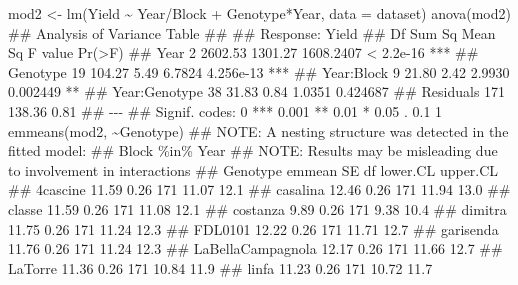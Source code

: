 \documentclass[a4paper,12pt,oneside]{book}
\newenvironment{Shaded}{\begin{snugshade}}{\end{snugshade}}
\newcommand{\SpecialCharTok}[1]{#1}
\newcommand{\DocumentationTok}[1]{#1}
\newcommand{\OtherTok}[1]{#1}
\newcommand{\FunctionTok}[1]{#1}
\newcommand{\AttributeTok}[1]{#1}
\newcommand{\AlertTok}[1]{#1}
\newcommand{\NormalTok}[1]{#1}
\begin{document}
\begin{Shaded}
\begin{Highlighting}[]
\NormalTok{mod2 }\OtherTok{\textless{}{-}} \FunctionTok{lm}\NormalTok{(Yield }\SpecialCharTok{\textasciitilde{}}\NormalTok{ Year}\SpecialCharTok{/}\NormalTok{Block }\SpecialCharTok{+}\NormalTok{ Genotype}\SpecialCharTok{*}\NormalTok{Year, }
           \AttributeTok{data =}\NormalTok{ dataset)}
\FunctionTok{anova}\NormalTok{(mod2)}
\DocumentationTok{\#\# Analysis of Variance Table}
\DocumentationTok{\#\# }
\DocumentationTok{\#\# Response: Yield}
\DocumentationTok{\#\#                Df  Sum Sq Mean Sq   F value    Pr(\textgreater{}F)    }
\DocumentationTok{\#\# Year            2 2602.53 1301.27 1608.2407 \textless{} 2.2e{-}16 ***}
\DocumentationTok{\#\# Genotype       19  104.27    5.49    6.7824 4.256e{-}13 ***}
\DocumentationTok{\#\# Year:Block      9   21.80    2.42    2.9930  0.002449 ** }
\DocumentationTok{\#\# Year:Genotype  38   31.83    0.84    1.0351  0.424687    }
\DocumentationTok{\#\# Residuals     171  138.36    0.81                        }
\DocumentationTok{\#\# {-}{-}{-}}
\DocumentationTok{\#\# Signif. codes:  0 \textquotesingle{}***\textquotesingle{} 0.001 \textquotesingle{}**\textquotesingle{} 0.01 \textquotesingle{}*\textquotesingle{} 0.05 \textquotesingle{}.\textquotesingle{} 0.1 \textquotesingle{} \textquotesingle{} 1}
\FunctionTok{emmeans}\NormalTok{(mod2, }\SpecialCharTok{\textasciitilde{}}\NormalTok{Genotype)}
\DocumentationTok{\#\# }\AlertTok{NOTE}\DocumentationTok{: A nesting structure was detected in the fitted model:}
\DocumentationTok{\#\#     Block \%in\% Year}
\DocumentationTok{\#\# }\AlertTok{NOTE}\DocumentationTok{: Results may be misleading due to involvement in interactions}
\DocumentationTok{\#\#  Genotype          emmean   SE  df lower.CL upper.CL}
\DocumentationTok{\#\#  4cascine           11.59 0.26 171    11.07     12.1}
\DocumentationTok{\#\#  casalina           12.46 0.26 171    11.94     13.0}
\DocumentationTok{\#\#  classe             11.59 0.26 171    11.08     12.1}
\DocumentationTok{\#\#  costanza            9.89 0.26 171     9.38     10.4}
\DocumentationTok{\#\#  dimitra            11.75 0.26 171    11.24     12.3}
\DocumentationTok{\#\#  FDL0101            12.22 0.26 171    11.71     12.7}
\DocumentationTok{\#\#  garisenda          11.76 0.26 171    11.24     12.3}
\DocumentationTok{\#\#  LaBellaCampagnola  12.17 0.26 171    11.66     12.7}
\DocumentationTok{\#\#  LaTorre            11.36 0.26 171    10.84     11.9}
\DocumentationTok{\#\#  linfa              11.23 0.26 171    10.72     11.7}

\end{Highlighting}
\end{Shaded}
\end{document}
